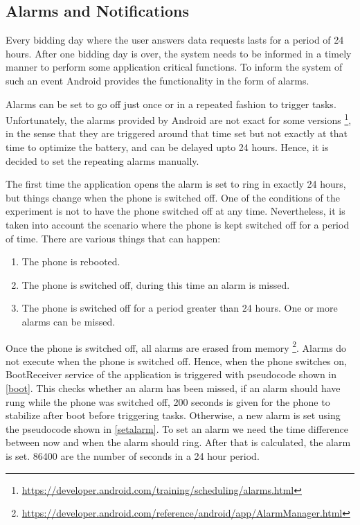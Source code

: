 \subsection{Alarms and Notifications}

Every bidding day where the user answers data requests lasts for a period of 24 hours. After one bidding day is over, the system needs to be informed in a timely manner to perform some application critical functions. To inform the system of such an event Android provides the functionality in the form of alarms. 

Alarms can be set to go off just once or in a repeated fashion to trigger tasks. Unfortunately, the alarms provided by Android are not exact for some versions \footnote{\url{https://developer.android.com/training/scheduling/alarms.html}}, in the sense that they are triggered around that time set but not exactly at that time to optimize the battery, and can be delayed upto 24 hours. Hence, it is decided to set the repeating alarms manually. 

The first time the application opens the alarm is set to ring in exactly 24 hours, but things change when the phone is switched off.
One of the conditions of the experiment is not to have the phone switched off at any time. Nevertheless, it is taken into account the scenario where
the phone is kept switched off for a period of time. There are various things that can happen:

\begin{enumerate}
	\item The phone is rebooted.
	\item The phone is switched off, during this time an alarm is missed.
    \item The phone is switched off for a period greater than 24 hours. One or more alarms can be missed.
\end{enumerate}

Once the phone is switched off, all alarms are erased from memory \footnote{\url{https://developer.android.com/reference/android/app/AlarmManager.html}}. Alarms do not execute when the phone is switched off. Hence, when the phone switches on,
BootReceiver service of the application is triggered with pseudocode shown in \ref{boot}. This checks whether an alarm has been missed, if an alarm should have rung while the phone was switched off, 200 seconds is given for the phone to stabilize after boot before triggering tasks. Otherwise, a new alarm is set using the pseudocode shown in \ref{setalarm}. To set an alarm we need the time difference between now and when the alarm should ring. After that is calculated, the alarm is set. 86400 are the number of seconds in a 24 hour period.

